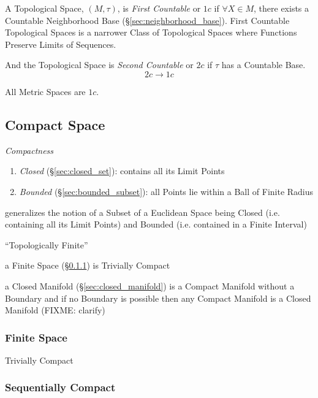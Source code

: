 A Topological Space, $(M,\tau)$, is \emph{First Countable} or $1c$ if
$\forall X \in M$, there exists a Countable Neighborhood Base
(\S\ref{sec:neighborhood_base}). First Countable Topological Spaces is
a narrower Class of Topological Spaces where Functions Preserve Limits
of Sequences. %

And the Topological Space is \emph{Second Countable} or $2c$ if $\tau$
has a Countable Base.
\[
  2c \rightarrow 1c
\]

All Metric Spaces are $1c$.



\subsection{Compact Space}\label{sec:compact_space}

\emph{Compactness}

\begin{enumerate}
\item \emph{Closed} (\S\ref{sec:closed_set}): contains all its Limit Points
\item \emph{Bounded} (\S\ref{sec:bounded_subset}): all Points lie within a Ball
  of Finite Radius
\end{enumerate}

generalizes the notion of a Subset of a Euclidean Space being Closed
(i.e. containing all its Limit Points) and Bounded (i.e. contained in
a Finite Interval)

``Topologically Finite''

a Finite Space (\S\ref{sec:finite_space}) is Trivially Compact

\fist a Closed Manifold (\S\ref{sec:closed_manifold}) is a Compact Manifold
without a Boundary and if no Boundary is possible then any Compact Manifold
is a Closed Manifold (FIXME: clarify)



\subsubsection{Finite Space}\label{sec:finite_space}

Trivially Compact



\subsubsection{Sequentially Compact}\label{sec:sequentially_compact}

